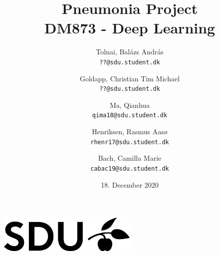 \documentclass[11pt]{article}
\author{
	Tolnai, Balázs András\\
 	\texttt{??@sdu.student.dk}
  	\and  
  	Goldapp, Christian Tim Michael\\
  	\texttt{??@sdu.student.dk}
  	\and
  	Ma, Qianhua\\
  	\texttt{qima18@sdu.student.dk}
  	\and
  	Henriksen, Rasmus Aasø\\
  	\texttt{rhenr17@sdu.student.dk}
  	\and
  	Bach, Camilla Marie\\
  	\texttt{cabac19@sdu.student.dk}
}
\date{18. December 2020}
\title{%
  \textbf{Pneumonia Project} \\
  \vspace{10mm}
  \large DM873 - Deep Learning}
\begin{document}
	\maketitle
	\thispagestyle{empty}
	\vspace{1.8cm}
       	\begin{center}
       		\includegraphics[width=0.5\textwidth]{SDU_BLACK_RGB}
       	\end{center}
	 	\vspace{1.8cm}
	\newpage
	\tableofcontents
	\newpage


	

	

	

	
	
\end{document}
